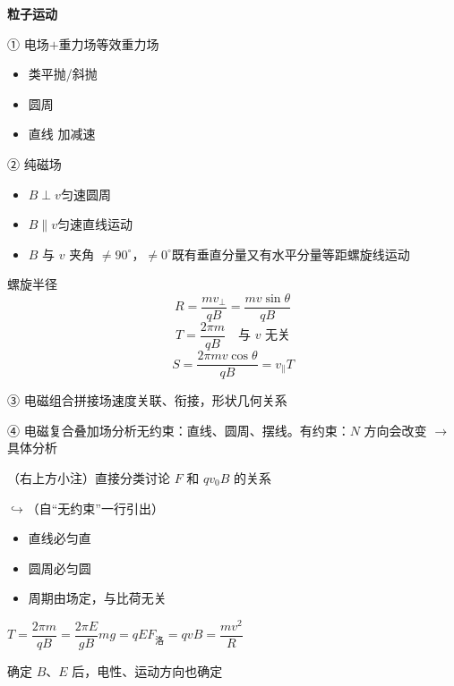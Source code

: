 \textbf{粒子运动}

① 电场$+$重力场\quad 等效重力场
\begin{itemize}
\item 类平抛/斜抛
\item 圆周
\item 直线 加减速
\end{itemize}

② 纯磁场
\begin{itemize}
\item $B\perp v$\quad 匀速圆周
\item $B\parallel v$\quad 匀速直线运动
\item $B$ 与 $v$ 夹角 $\ne 90^\circ$，$\ne 0^\circ$\quad 既有垂直分量又有水平分量\quad 等距螺旋线运动
\end{itemize}
螺旋半径
\[
R=\frac{mv_{\perp}}{qB}=\frac{mv\sin\theta}{qB}
\]
\[
T=\frac{2\pi m}{qB}\quad\text{与 $v$ 无关}
\]
\[
S=\frac{2\pi mv\cos\theta}{qB}=v_{\parallel}T
\]

③ 电磁组合拼接场\quad 速度关联、衔接，形状几何关系

④ 电磁复合叠加场\quad 分析\quad 无约束：直线、圆周、摆线。有约束：$N$ 方向会改变 $\to$ 具体分析

（右上方小注）直接分类讨论 $F$ 和 $qv_0B$ 的关系
\par\smallskip
$\hookrightarrow$（自“无约束”一行引出）
\begin{itemize}
\item 直线必匀直
\item 圆周必匀圆
\item 周期由场定，与比荷无关
\end{itemize}
$T=\dfrac{2\pi m}{qB}=\dfrac{2\pi E}{gB}$\qquad $mg=qE$\qquad $F_{\text{洛}}=qvB=\dfrac{mv^2}{R}$

确定 $B$、$E$ 后，电性、运动方向也确定

